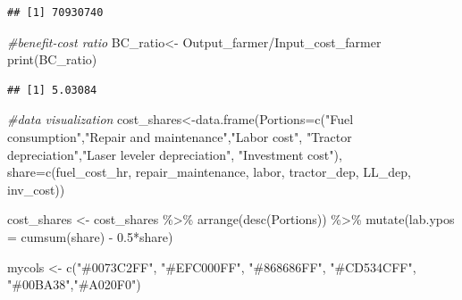 \documentclass[
]{article}
\newenvironment{Shaded}{\begin{snugshade}}{\end{snugshade}}
\newcommand{\AttributeTok}[1]{\textcolor[rgb]{0.77,0.63,0.00}{#1}}
\newcommand{\CommentTok}[1]{\textcolor[rgb]{0.56,0.35,0.01}{\textit{#1}}}
\newcommand{\FloatTok}[1]{\textcolor[rgb]{0.00,0.00,0.81}{#1}}
\newcommand{\FunctionTok}[1]{\textcolor[rgb]{0.00,0.00,0.00}{#1}}
\newcommand{\NormalTok}[1]{#1}
\newcommand{\OtherTok}[1]{\textcolor[rgb]{0.56,0.35,0.01}{#1}}
\newcommand{\SpecialCharTok}[1]{\textcolor[rgb]{0.00,0.00,0.00}{#1}}
\newcommand{\StringTok}[1]{\textcolor[rgb]{0.31,0.60,0.02}{#1}}
\begin{document}
\begin{verbatim}
## [1] 70930740
\end{verbatim}

\begin{Shaded}
\begin{Highlighting}[]
\CommentTok{\#benefit{-}cost ratio}
\NormalTok{BC\_ratio}\OtherTok{\textless{}{-}}\NormalTok{ Output\_farmer}\SpecialCharTok{/}\NormalTok{Input\_cost\_farmer}
\FunctionTok{print}\NormalTok{(BC\_ratio)}
\end{Highlighting}
\end{Shaded}

\begin{verbatim}
## [1] 5.03084
\end{verbatim}

\begin{Shaded}
\begin{Highlighting}[]
\CommentTok{\#data visualization}
\NormalTok{cost\_shares}\OtherTok{\textless{}{-}}\FunctionTok{data.frame}\NormalTok{(}\AttributeTok{Portions=}\FunctionTok{c}\NormalTok{(}\StringTok{"Fuel consumption"}\NormalTok{,}\StringTok{"Repair and maintenance"}\NormalTok{,}\StringTok{"Labor cost"}\NormalTok{, }\StringTok{"Tractor depreciation"}\NormalTok{,}\StringTok{"Laser leveler depreciation"}\NormalTok{, }\StringTok{"Investment cost"}\NormalTok{), }\AttributeTok{share=}\FunctionTok{c}\NormalTok{(fuel\_cost\_hr, repair\_maintenance, labor, tractor\_dep, LL\_dep, inv\_cost))}


\NormalTok{cost\_shares }\OtherTok{\textless{}{-}}\NormalTok{ cost\_shares }\SpecialCharTok{\%\textgreater{}\%}
  \FunctionTok{arrange}\NormalTok{(}\FunctionTok{desc}\NormalTok{(Portions)) }\SpecialCharTok{\%\textgreater{}\%}
  \FunctionTok{mutate}\NormalTok{(}\AttributeTok{lab.ypos =} \FunctionTok{cumsum}\NormalTok{(share) }\SpecialCharTok{{-}} \FloatTok{0.5}\SpecialCharTok{*}\NormalTok{share)}

\NormalTok{mycols }\OtherTok{\textless{}{-}} \FunctionTok{c}\NormalTok{(}\StringTok{"\#0073C2FF"}\NormalTok{, }\StringTok{"\#EFC000FF"}\NormalTok{, }\StringTok{"\#868686FF"}\NormalTok{, }\StringTok{"\#CD534CFF"}\NormalTok{, }\StringTok{"\#00BA38"}\NormalTok{,}\StringTok{"\#A020F0"}\NormalTok{)}


\end{Highlighting}
\end{Shaded}
\end{document}
